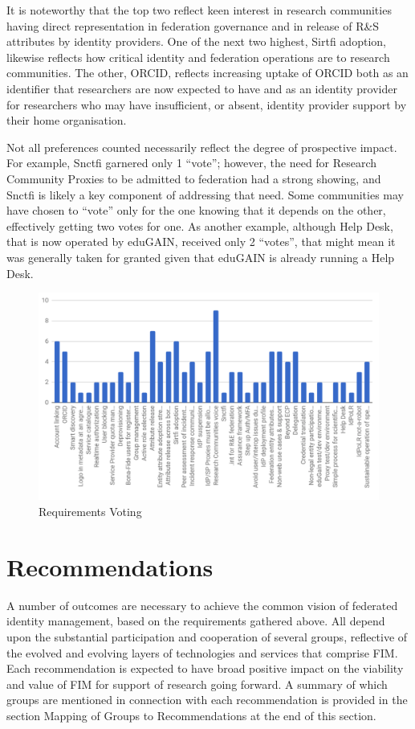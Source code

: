 \documentclass[fleqn,11pt]{wlscirep}
\begin{document}
{It is noteworthy that the top two reflect keen interest in research communities having direct representation in federation governance and in release of R\&S attributes by identity providers. One of the next two highest, Sirtfi adoption, likewise reflects how critical identity and federation operations are to research communities. The other, ORCID, reflects increasing uptake of ORCID both as an identifier that researchers are now expected to have and as an identity provider for researchers who may have insufficient, or absent, identity provider support by their home organisation.

Not all preferences counted necessarily reflect the degree of prospective impact. For example, Snctfi garnered only 1 “vote”; however, the need for Research Community Proxies to be admitted to federation had a strong showing, and Snctfi is likely a key component of addressing that need. Some communities may have chosen to “vote” only for the one knowing that it depends on the other, effectively getting two votes for one. As another example, although Help Desk, that is now operated by eduGAIN, received only 2 “votes”, that might mean it was generally taken for granted given that eduGAIN is already running a Help Desk. 

\begin{figure}[ht!]
  \centering
  \includegraphics[width=0.7\columnwidth]{RequirementsVoting.png}
  \caption{Requirements Voting}
  \label{fig:voting}
\end{figure}

\section{Recommendations}
A number of outcomes are necessary to achieve the common vision of federated identity management, based on the requirements gathered above. All depend upon the substantial participation and cooperation of several groups, reflective of the evolved and evolving layers of technologies and services that comprise FIM. Each recommendation is expected to have broad positive impact on the viability and value of FIM for support of research going forward. A summary of which groups are mentioned in connection with each recommendation is provided in the section Mapping of Groups to Recommendations at the end of this section.
}
\end{document}

